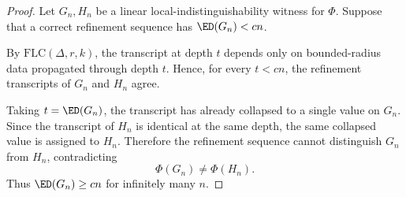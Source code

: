 \begin{proof}
Let $G_n,H_n$ be a linear local-indistinguishability witness for $\Phi$.
Suppose that a correct refinement sequence has $\ED(G_n)<c n$.

By $\mathrm{FLC}(\Delta,r,k)$, the transcript at depth $t$ depends only on
bounded-radius data propagated through depth $t$. Hence, for every $t<c n$,
the refinement transcripts of $G_n$ and $H_n$ agree.

Taking $t=\ED(G_n)$, the transcript has already collapsed to a single value
on $G_n$. Since the transcript of $H_n$ is identical at the same depth, the
same collapsed value is assigned to $H_n$. Therefore the refinement sequence
cannot distinguish $G_n$ from $H_n$, contradicting
\[
\Phi(G_n)\neq \Phi(H_n).
\]
Thus $\ED(G_n)\ge c n$ for infinitely many $n$.
\end{proof}
